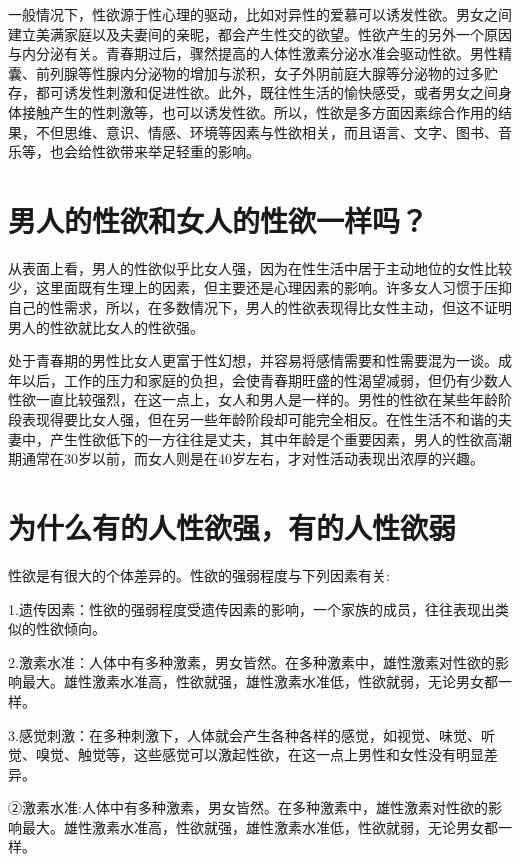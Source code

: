\documentclass[12pt,UTF8]{ctexbook}
\begin{document}
一般情况下，性欲源于性心理的驱动，比如对异性的爱慕可以诱发性欲。男女之间建立美满家庭以及夫妻间的亲昵，都会产生性交的欲望。性欲产生的另外一个原因与内分泌有关。青春期过后，骤然提高的人体性激素分泌水准会驱动性欲。男性精囊、前列腺等性腺内分泌物的增加与淤积，女子外阴前庭大腺等分泌物的过多贮存，都可诱发性刺激和促进性欲。此外，既往性生活的愉快感受，或者男女之间身体接触产生的性刺激等，也可以诱发性欲。所以，性欲是多方面因素综合作用的结果，不但思维、意识、情感、环境等因素与性欲相关，而且语言、文字、图书、音乐等，也会给性欲带来举足轻重的影响。

\section{男人的性欲和女人的性欲一样吗？}

从表面上看，男人的性欲似乎比女人强，因为在性生活中居于主动地位的女性比较少，这里面既有生理上的因素，但主要还是心理因素的影响。许多女人习惯于压抑自己的性需求，所以，在多数情况下，男人的性欲表现得比女性主动，但这不证明男人的性欲就比女人的性欲强。

处于青春期的男性比女人更富于性幻想，并容易将感情需要和性需要混为一谈。成年以后，工作的压力和家庭的负担，会使青春期旺盛的性渴望减弱，但仍有少数人性欲一直比较强烈，在这一点上，女人和男人是一样的。男性的性欲在某些年龄阶段表现得要比女人强，但在另一些年龄阶段却可能完全相反。在性生活不和谐的夫妻中，产生性欲低下的一方往往是丈夫，其中年龄是个重要因素，男人的性欲高潮期通常在30岁以前，而女人则是在40岁左右，才对性活动表现出浓厚的兴趣。

\section{为什么有的人性欲强，有的人性欲弱}

性欲是有很大的个体差异的。性欲的强弱程度与下列因素有关:

1.遗传因素：性欲的强弱程度受遗传因素的影响，一个家族的成员，往往表现出类似的性欲倾向。

2.激素水准：人体中有多种激素，男女皆然。在多种激素中，雄性激素对性欲的影响最大。雄性激素水准高，性欲就强，雄性激素水准低，性欲就弱，无论男女都一样。

3.感觉刺激：在多种刺激下，人体就会产生各种各样的感觉，如视觉、味觉、听觉、嗅觉、触觉等，这些感觉可以激起性欲，在这一点上男性和女性没有明显差异。

②激素水准:人体中有多种激素，男女皆然。在多种激素中，雄性激素对性欲的影响最大。雄性激素水准高，性欲就强，雄性激素水准低，性欲就弱，无论男女都一样。
\end{document}
